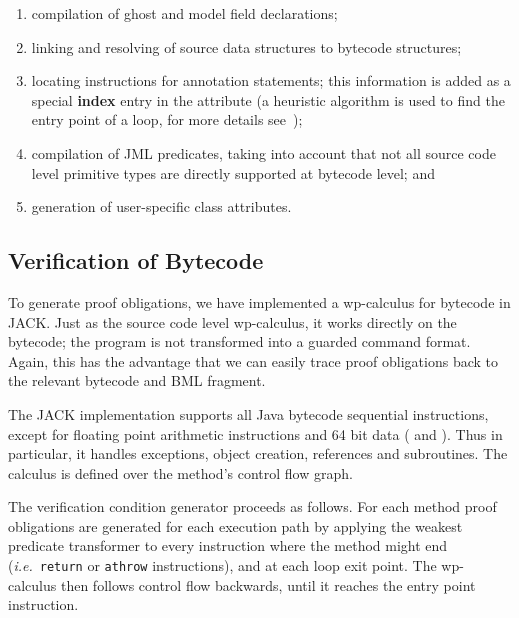 \begin{enumerate}

\item compilation of ghost and model field declarations;


\item linking and resolving of source data structures to bytecode structures;

\item locating instructions for annotation statements; this
information is added as a special \textbf{index} entry in the
attribute (a heuristic algorithm is used to find the entry point of a
loop, for more details see~\cite{Pavlova:phd});

 
\item compilation of JML predicates, taking into account that not all
source code level primitive types are directly supported at bytecode
level; and

\item generation of user-specific class attributes.
    
\end{enumerate}


\subsection{Verification of Bytecode}
To generate proof obligations, we have implemented a wp-calculus for
bytecode in JACK. Just as the source code level wp-calculus, it
works directly on the bytecode; the program is not transformed into a
guarded command format. Again, this has the
advantage that we can easily trace proof obligations back to the
relevant bytecode and BML fragment.

The JACK implementation supports all Java bytecode sequential
instructions, except for floating point arithmetic instructions and 64
bit data ( and ). Thus in particular, it
handles exceptions, object creation, references and subroutines. The
calculus is defined over the method's control flow graph.


The verification condition generator proceeds as follows. For each
method proof obligations are generated for each execution path by
applying the weakest predicate transformer to every instruction where
the method might end (\emph{i.e.}\ \texttt{return} or \texttt{athrow}
instructions), and at each loop exit point. The wp-calculus then
follows control flow backwards, until it reaches the entry point
instruction.

